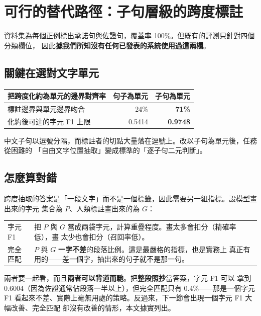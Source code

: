 \documentclass[11pt,a4paper]{ctexart}
\begin{document}
\section{可行的替代路徑：子句層級的跨度標註}
\label{sec:tagger}

資料集為每個正例標出承諾句與佐證句，覆蓋率 100\%。但既有的評測只針對四個分類欄位，
因此\textbf{據我們所知沒有任何已發表的系統使用過這兩欄}。

\subsection{關鍵在選對文字單元}

\begin{table}[h]
\centering\small
\begin{tabular}{@{}lrr@{}}
\toprule
把跨度化約為單元的邊界對齊率 & 句子為單元 & \textbf{子句為單元} \\
\midrule
標註邊界與單元邊界吻合 & 24\% & \textbf{71\%} \\
化約後可達的字元 F1 上限 & 0.5414 & \textbf{0.9748} \\
\bottomrule
\end{tabular}
\end{table}

中文子句以逗號分隔，而標註者的切點大量落在逗號上。改以子句為單元後，任務從困難的
「自由文字位置抽取」變成標準的「逐子句二元判斷」。

\subsection{怎麼算對錯}

跨度抽取的答案是「一段文字」而不是一個標籤，因此需要另一組指標。設模型畫出來的字元
集合為 $P$、人類標註畫出來的為 $G$：

\begin{table}[h]
\centering\small
\begin{tabular}{@{}p{2.6cm}p{12cm}@{}}
\toprule
字元 F1 & 把 $P$ 與 $G$ 當成兩袋字元，計算重疊程度。畫太多會扣分（精確率低），畫
太少也會扣分（召回率低）。 \\
\addlinespace
完全匹配 & $P$ 與 $G$ \textbf{一字不差}的段落比例。這是最嚴格的指標，也是實務上
真正有用的——差一個字，抽出來的句子就不是那一句。 \\
\bottomrule
\end{tabular}
\end{table}

兩者要一起看，而且\textbf{兩者可以背道而馳}。把\textbf{整段照抄}當答案，字元 F1 可以
拿到 0.6004（因為佐證通常佔段落一半以上），但完全匹配只有 0.4\%——那是一個字元 F1
看起來不差、實際上毫無用處的策略。反過來，下一節會出現一個字元 F1 大幅改善、完全匹配
卻沒有改善的情形，本文據實列出。
\end{document}
